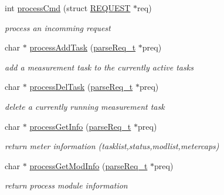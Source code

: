 \begin{DoxyCompactItemize}
int \hyperlink{classCtrlComm_abb7de8cec0d6a04b1b722b25cb42ba5c}{process\+Cmd} (struct \hyperlink{structREQUEST}{R\+E\+Q\+U\+E\+ST} $\ast$req)
\begin{DoxyCompactList}\small\item\em process an incomming request \end{DoxyCompactList}\item 
\mbox{\label{classCtrlComm_a3f9a7f22a18747a813268edc671b23d7}} 
char $\ast$ \hyperlink{classCtrlComm_a3f9a7f22a18747a813268edc671b23d7}{process\+Add\+Task} (\hyperlink{structparseReq__t}{parse\+Req\+\_\+t} $\ast$preq)
\begin{DoxyCompactList}\small\item\em add a measurement task to the currently active tasks \end{DoxyCompactList}\item 
\mbox{\label{classCtrlComm_a82207d237fd23eae2f55ff22ecd4f72c}} 
char $\ast$ \hyperlink{classCtrlComm_a82207d237fd23eae2f55ff22ecd4f72c}{process\+Del\+Task} (\hyperlink{structparseReq__t}{parse\+Req\+\_\+t} $\ast$preq)
\begin{DoxyCompactList}\small\item\em delete a currently running measurement task \end{DoxyCompactList}\item 
\mbox{\label{classCtrlComm_a62d5416d60123b5e13a613a4f7922e59}} 
char $\ast$ \hyperlink{classCtrlComm_a62d5416d60123b5e13a613a4f7922e59}{process\+Get\+Info} (\hyperlink{structparseReq__t}{parse\+Req\+\_\+t} $\ast$preq)
\begin{DoxyCompactList}\small\item\em return meter information (tasklist,status,modlist,metercaps) \end{DoxyCompactList}\item 
\mbox{\label{classCtrlComm_adc079d5c19f2a75eaa4a21540e3e39a7}} 
char $\ast$ \hyperlink{classCtrlComm_adc079d5c19f2a75eaa4a21540e3e39a7}{process\+Get\+Mod\+Info} (\hyperlink{structparseReq__t}{parse\+Req\+\_\+t} $\ast$preq)
\begin{DoxyCompactList}\small\item\em return process module information \end{DoxyCompactList}\item 

\end{DoxyCompactItemize}
